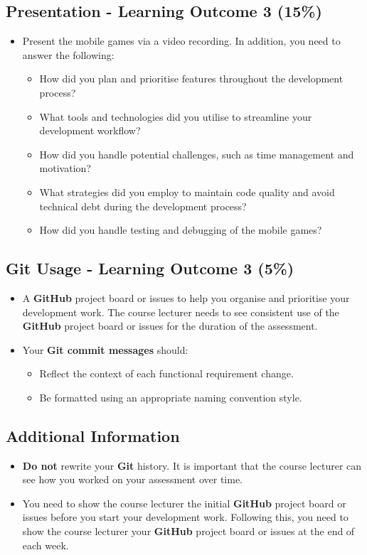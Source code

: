 \documentclass{article}
\begin{document}
\subsection*{Presentation - Learning Outcome 3 (15\%)} 
\begin{itemize}
	\item Present the mobile games via a video recording. In addition, you need to answer the following:
	\begin{itemize}
		\item How did you plan and prioritise features throughout the development process?
		\item What tools and technologies did you utilise to streamline your development workflow?
		\item How did you handle potential challenges, such as time management and motivation?
		\item What strategies did you employ to maintain code quality and avoid technical debt during the development process?
		\item How did you handle testing and debugging of the mobile games?
	\end{itemize}
\end{itemize}

\subsection*{Git Usage - Learning Outcome 3 (5\%)}
\begin{itemize}
	\item A \textbf{GitHub} project board or issues to help you organise and prioritise your development work. The course lecturer needs to see consistent use of the \textbf{GitHub} project board or issues for the duration of the assessment.
    \item Your \textbf{Git commit messages} should:
    \begin{itemize}
      \item Reflect the context of each functional requirement change.
      \item Be formatted using an appropriate naming convention style.
    \end{itemize}
\end{itemize}

\subsection*{Additional Information}
\begin{itemize}
    \item \textbf{Do not} rewrite your \textbf{Git} history. It is important that the course lecturer can see how you worked on your assessment over time. 
    \item You need to show the course lecturer the initial \textbf{GitHub} project board or issues before you start your development work. Following this, you need to show the course lecturer your \textbf{GitHub} project board or issues at the end of each week.
\end{itemize} 
\end{document}
